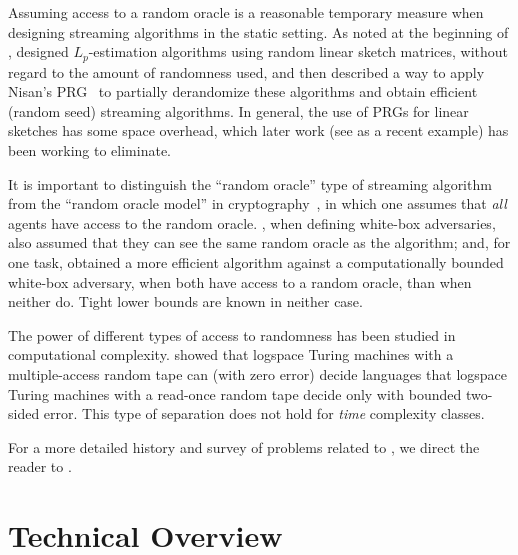 \begin{itemize}
\begin{itemize}
Assuming access to a random oracle is a reasonable temporary measure when
designing streaming algorithms in the static setting. As noted at the
beginning of , \cite{Indyk06} designed $L_p$-estimation
algorithms using random linear sketch matrices, without regard to the amount
of randomness used, and then described a way to apply Nisan's
PRG~\cite{Nisan90} to partially derandomize these algorithms and obtain
efficient (random seed) streaming algorithms. In general, the use of PRGs for
linear sketches has some space overhead, which later work (see
\cite{JayaramW23} as a recent example) has been working to eliminate.

It is important to distinguish the ``random oracle'' type of streaming
algorithm from the ``random oracle model'' in cryptography~\cite{BellareR93},
in which one assumes that \emph{all} agents have access to the random oracle.
\cite{AjtaiBJSSWZ22}, when defining white-box adversaries, also assumed that
they can see the same random oracle as the algorithm; and, for one task,
obtained a more efficient algorithm against a computationally bounded
white-box adversary, when both have access to a random oracle, than when
neither do.  Tight lower bounds are known in neither case.

The power of different types of access to randomness has been studied in
computational complexity. \cite{Nisan93B} showed that logspace Turing machines
with a multiple-access random tape can (with zero error) decide languages that
logspace Turing machines with a read-once random tape decide only with bounded
two-sided error. This type of separation does not hold for {\em time}
complexity classes.

For a more detailed history and survey of problems related to \miflong, we
direct the reader to \cite{Stoeckl23}.


\section{Technical Overview}\label{sec:technical-overview}


\end{itemize}
\end{itemize}

